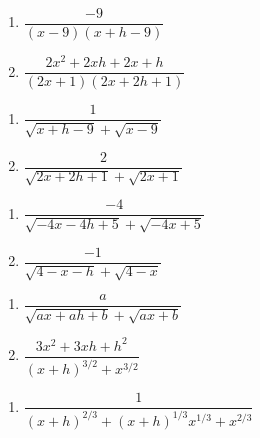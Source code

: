 \begin{multicols}{2}
\begin{enumerate}
\setcounter{enumi}{\value{HW}}

\item $\dfrac{-9}{(x - 9)(x + h - 9)}$
\item $\dfrac{2x^2+2xh+2x+h}{(2x+1)(2x+2h+1)}$

\setcounter{HW}{\value{enumi}}
\end{enumerate}
\end{multicols}

\begin{multicols}{2}
\begin{enumerate}
\setcounter{enumi}{\value{HW}}

\item  $\dfrac{1}{\sqrt{x+h-9} + \sqrt{x-9}}$
\item $\dfrac{2}{\sqrt{2x+2h+1} + \sqrt{2x+1}}$

\setcounter{HW}{\value{enumi}}
\end{enumerate}
\end{multicols}

\begin{multicols}{2}
\begin{enumerate}
\setcounter{enumi}{\value{HW}}

\item $\dfrac{-4}{\sqrt{-4x-4h+5} + \sqrt{-4x+5}}$
\item $\dfrac{-1}{\sqrt{4-x-h} + \sqrt{4-x}}$

\setcounter{HW}{\value{enumi}}
\end{enumerate}
\end{multicols}

\begin{multicols}{2}
\begin{enumerate}
\setcounter{enumi}{\value{HW}}

\item $\dfrac{a}{\sqrt{ax+ah+b} + \sqrt{ax+b}}$
\item  $\dfrac{3x^2+3xh+h^2}{(x+h)^{3/2} + x^{3/2}} $

\setcounter{HW}{\value{enumi}}
\end{enumerate}
\end{multicols}

\begin{enumerate}
\setcounter{enumi}{\value{HW}}

\item  $\dfrac{1}{(x+h)^{2/3} + (x+h)^{1/3} x^{1/3} + x^{2/3}}$

\setcounter{HW}{\value{enumi}}
\end{enumerate}


